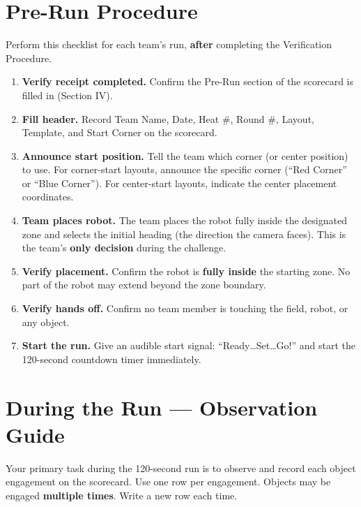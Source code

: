 \documentclass[a4]{article}
\begin{document}
\pagebreak
\section*{Pre-Run Procedure}

Perform this checklist for each team's run, \textbf{after} completing the Verification Procedure.

\begin{enumerate}
    \item \textbf{Verify receipt completed.} Confirm the Pre-Run section of the scorecard is filled in (Section IV).

    \item \textbf{Fill header.} Record Team Name, Date, Heat \#, Round \#, Layout, Template, and Start Corner on the scorecard.

    \item \textbf{Announce start position.} Tell the team which corner (or center position) to use. For corner-start layouts, announce the specific corner (``Red Corner'' or ``Blue Corner''). For center-start layouts, indicate the center placement coordinates.

    \item \textbf{Team places robot.} The team places the robot fully inside the designated zone and selects the initial heading (the direction the camera faces). This is the team's \textbf{only decision} during the challenge.

    \item \textbf{Verify placement.} Confirm the robot is \textbf{fully inside} the starting zone. No part of the robot may extend beyond the zone boundary.

    \item \textbf{Verify hands off.} Confirm no team member is touching the field, robot, or any object.

    \item \textbf{Start the run.} Give an audible start signal: ``Ready\ldots Set\ldots Go!'' and start the 120-second countdown timer immediately.
\end{enumerate}

\pagebreak
\section*{During the Run --- Observation Guide}

Your primary task during the 120-second run is to observe and record each object engagement on the scorecard. Use one row per engagement. Objects may be engaged \textbf{multiple times}. Write a new row each time.
\end{document}
